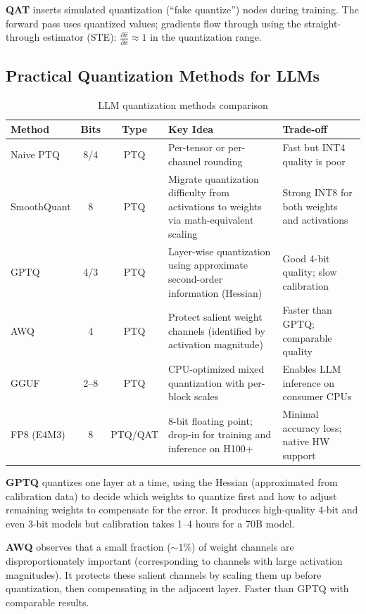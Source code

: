 \textbf{QAT} inserts simulated quantization (``fake quantize'') nodes during training. The forward pass uses quantized values; gradients flow through using the straight-through estimator (STE): $\frac{\partial \hat{x}}{\partial x} \approx 1$ in the quantization range.

\subsection{Practical Quantization Methods for LLMs}

\begin{table}[H]
\centering
\caption{LLM quantization methods comparison}
\begin{tabularx}{\textwidth}{lccXX}
\toprule
\textbf{Method} & \textbf{Bits} & \textbf{Type} & \textbf{Key Idea} & \textbf{Trade-off} \\
\midrule
Naive PTQ & 8/4 & PTQ & Per-tensor or per-channel rounding & Fast but INT4 quality is poor \\
SmoothQuant & 8 & PTQ & Migrate quantization difficulty from activations to weights via math-equivalent scaling & Strong INT8 for both weights and activations \\
GPTQ & 4/3 & PTQ & Layer-wise quantization using approximate second-order information (Hessian) & Good 4-bit quality; slow calibration \\
AWQ & 4 & PTQ & Protect salient weight channels (identified by activation magnitude) & Faster than GPTQ; comparable quality \\
GGUF & 2--8 & PTQ & CPU-optimized mixed quantization with per-block scales & Enables LLM inference on consumer CPUs \\
FP8 (E4M3) & 8 & PTQ/QAT & 8-bit floating point; drop-in for training and inference on H100+ & Minimal accuracy loss; native HW support \\
\bottomrule
\end{tabularx}
\end{table}

\textbf{GPTQ} quantizes one layer at a time, using the Hessian (approximated from calibration data) to decide which weights to quantize first and how to adjust remaining weights to compensate for the error. It produces high-quality 4-bit and even 3-bit models but calibration takes 1--4 hours for a 70B model.

\textbf{AWQ} observes that a small fraction ($\sim$1\%) of weight channels are disproportionately important (corresponding to channels with large activation magnitudes). It protects these salient channels by scaling them up before quantization, then compensating in the adjacent layer. Faster than GPTQ with comparable results.

